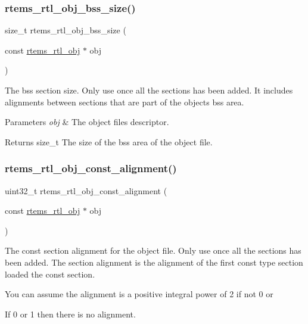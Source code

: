 \subsubsection{\texorpdfstring{rtems\_rtl\_obj\_bss\_size()}{rtems\_rtl\_obj\_bss\_size()}}
{\footnotesize\ttfamily size\+\_\+t rtems\+\_\+rtl\+\_\+obj\+\_\+bss\+\_\+size (\begin{DoxyParamCaption}\item[{const \mbox{\hyperlink{structrtems__rtl__obj}{rtems\+\_\+rtl\+\_\+obj}} $\ast$}]{obj }\end{DoxyParamCaption})}

The bss section size. Only use once all the sections has been added. It includes alignments between sections that are part of the object\textquotesingle{}s bss area.


\begin{DoxyParams}{Parameters}
{\em obj} & The object file\textquotesingle{}s descriptor. \\
\hline
\end{DoxyParams}
\begin{DoxyReturn}{Returns}
size\+\_\+t The size of the bss area of the object file. 
\end{DoxyReturn}
\mbox{\label{rtl-obj_8h_aee3ea1f29f12981579b1d1939bb9907f}} 
\subsubsection{\texorpdfstring{rtems\_rtl\_obj\_const\_alignment()}{rtems\_rtl\_obj\_const\_alignment()}}
{\footnotesize\ttfamily uint32\+\_\+t rtems\+\_\+rtl\+\_\+obj\+\_\+const\+\_\+alignment (\begin{DoxyParamCaption}\item[{const \mbox{\hyperlink{structrtems__rtl__obj}{rtems\+\_\+rtl\+\_\+obj}} $\ast$}]{obj }\end{DoxyParamCaption})}

The const section alignment for the object file. Only use once all the sections has been added. The section alignment is the alignment of the first const type section loaded the const section.

You can assume the alignment is a positive integral power of 2 if not 0 or
\begin{DoxyEnumerate}
\item If 0 or 1 then there is no alignment.
\end{DoxyEnumerate}


